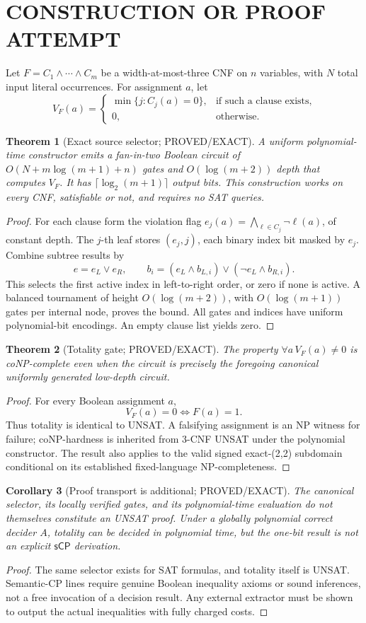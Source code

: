 \documentclass[11pt]{article}
\newtheorem{theorem}{Theorem}
\newtheorem{corollary}[theorem]{Corollary}
\newcommand{\sCP}{\ensuremath{\mathsf{sCP}}}
\begin{document}
\section{CONSTRUCTION OR PROOF ATTEMPT}
Let \(F=C_1\wedge\cdots\wedge C_m\) be a width-at-most-three
CNF on \(n\) variables, with \(N\) total input literal occurrences.
For assignment \(a\), let
\[
V_F(a)=\begin{cases}
\min\{j:C_j(a)=0\},&\text{if such a clause exists},\\
0,&\text{otherwise}.
\end{cases}
\]
\begin{theorem}[Exact source selector; PROVED/EXACT]
A uniform polynomial-time constructor emits a fan-in-two Boolean
circuit of \(O(N+m\log(m+1)+n)\) gates and \(O(\log(m+2))\) depth
that computes \(V_F\). It has \(\lceil\log_2(m+1)\rceil\) output
bits. This construction works on every CNF, satisfiable or not,
and requires no SAT queries.
\end{theorem}
\begin{proof}
For each clause form the violation flag
\(e_j(a)=\bigwedge_{\ell\in C_j}\neg\ell(a)\), of constant
depth. The \(j\)-th leaf stores \((e_j,j)\), each binary index
bit masked by \(e_j\). Combine subtree results by
\[
 e=e_L\vee e_R,\qquad
 b_i=(e_L\wedge b_{L,i})\vee(\neg e_L\wedge b_{R,i}).
\]
This selects the first active index in left-to-right order,
or zero if none is active. A balanced tournament of height
\(O(\log(m+2))\), with \(O(\log(m+1))\) gates per internal
node, proves the bound. All gates and indices have uniform
polynomial-bit encodings. An empty clause list yields zero.
\end{proof}
\begin{theorem}[Totality gate; PROVED/EXACT]
The property \(\forall a\,V_F(a)\neq 0\) is coNP-complete
even when the circuit is precisely the foregoing canonical
uniformly generated low-depth circuit.
\end{theorem}
\begin{proof}
For every Boolean assignment \(a\),
\[
V_F(a)=0\iff F(a)=1.
\]
Thus totality is identical to UNSAT. A falsifying assignment is
an NP witness for failure; coNP-hardness is inherited from
3-CNF UNSAT under the polynomial constructor. The result also
applies to the valid signed exact-(2,2) subdomain conditional
on its established fixed-language NP-completeness.
\end{proof}
\begin{corollary}[Proof transport is additional; PROVED/EXACT]
The canonical selector, its locally verified gates, and its
polynomial-time evaluation do not themselves constitute
an UNSAT proof. Under a globally polynomial correct decider
\(A\), totality can be decided in polynomial time, but the
one-bit result is not an explicit \(\sCP\) derivation.
\end{corollary}
\begin{proof}
The same selector exists for SAT formulas, and totality
itself is UNSAT. Semantic-CP lines require genuine Boolean
inequality axioms or sound inferences, not a free invocation
of a decision result. Any external extractor must be shown
to output the actual inequalities with fully charged costs.
\end{proof}
\end{document}

